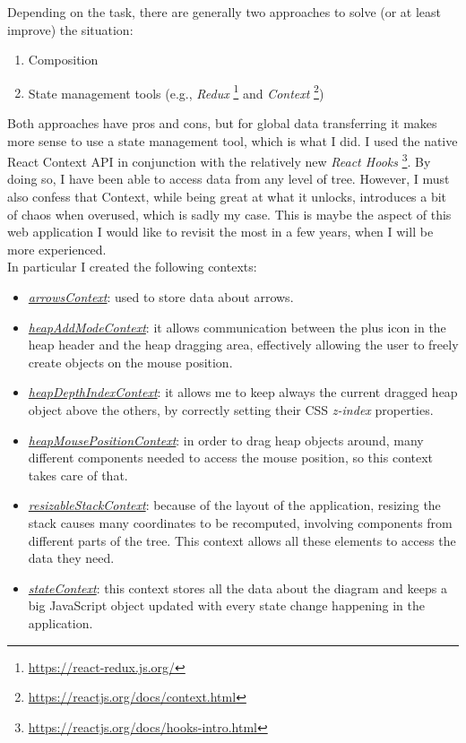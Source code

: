 \documentclass[]{usiinfbachelorproject}
\begin{document}
\noindent Depending on the task, there are generally two approaches to solve (or at least improve) the situation:

\begin{enumerate}
	\item Composition
	\item State management tools (e.g., \emph{Redux} \footnote{\url{https://react-redux.js.org/}} and \emph{Context} \footnote{\url{https://reactjs.org/docs/context.html}})
\end{enumerate}

\noindent Both approaches have pros and cons, but for global data transferring it makes more sense to use a state management tool, which is what I did. I used the native React Context API in conjunction with the relatively new \emph{React Hooks} \footnote{\url{https://reactjs.org/docs/hooks-intro.html}}. By doing so, I have been able to access data from any level of tree. However, I must also confess that Context, while being great at what it unlocks, introduces a bit of chaos when overused, which is sadly my case. This is maybe the aspect of this web application I would like to revisit the most in a few years, when I will be more experienced.\\

\noindent In particular I created the following contexts:

\begin{itemize}
	\item \ul{\emph{arrowsContext}}: used to store data about arrows.
	\item \ul{\emph{heapAddModeContext}}: it allows communication between the plus icon in the heap header and the heap dragging area, effectively allowing the user to freely create objects on the mouse position.
	\item \ul{\emph{heapDepthIndexContext}}: it allows me to keep always the current dragged heap object above the others, by correctly setting their CSS \emph{z-index} properties.
	\item \ul{\emph{heapMousePositionContext}}: in order to drag heap objects around, many different components needed to access the mouse position, so this context takes care of that.
	\item \ul{\emph{resizableStackContext}}: because of the layout of the application, resizing the stack causes many coordinates to be recomputed, involving components from different  parts of the tree. This context allows all these elements to access the data they need.
	\item \ul{\emph{stateContext}}: this context stores all the data about the diagram and keeps a big JavaScript object updated with every state change happening in the application.
\end{itemize}
\end{document}
